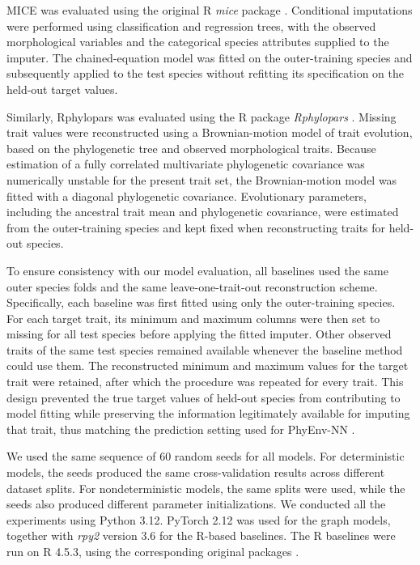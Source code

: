 \documentclass[preprint,12pt,authoryear]{elsarticle}
\newcommand{\awesomeModel}{PhyEnv-NN }
\begin{document}
MICE was evaluated using the original R \textit{mice} package \citep{van2011mice}. Conditional imputations were performed using classification and regression trees, with the observed morphological variables and the categorical species attributes supplied to the imputer. The chained-equation model was fitted on the outer-training species and subsequently applied to the test species without refitting its specification on the held-out target values.

Similarly, Rphylopars was evaluated using the R package \textit{Rphylopars} \citep{goolsby2017rphylopars}. Missing trait values were reconstructed using a Brownian-motion model of trait evolution, based on the phylogenetic tree and observed morphological traits. Because estimation of a fully correlated multivariate phylogenetic covariance was numerically unstable for the present trait set, the Brownian-motion model was fitted with a diagonal phylogenetic covariance. Evolutionary parameters, including the ancestral trait mean and phylogenetic covariance, were estimated from the outer-training species and kept fixed when reconstructing traits for held-out species.

To ensure consistency with our model evaluation, all baselines used the same outer species folds and the same leave-one-trait-out reconstruction scheme. Specifically, each baseline was first fitted using only the outer-training species. For each target trait, its minimum and maximum columns were then set to missing for all test species before applying the fitted imputer. Other observed traits of the same test species remained available whenever the baseline method could use them. The reconstructed minimum and maximum values for the target trait were retained, after which the procedure was repeated for every trait. This design prevented the true target values of held-out species from contributing to model fitting while preserving the information legitimately available for imputing that trait, thus matching the prediction setting used for \awesomeModel.

We used the same sequence of 60 random seeds for all models. For deterministic models, the seeds produced the same cross-validation results across different dataset splits. For nondeterministic models, the same splits were used, while the seeds also produced different parameter initializations. We conducted all the experiments using Python 3.12. PyTorch 2.12 was used for the graph models, together with \textit{rpy2} version 3.6 for the R-based baselines. The R baselines were run on R 4.5.3, using the corresponding original packages \citep{r2021r}.
\end{document}
